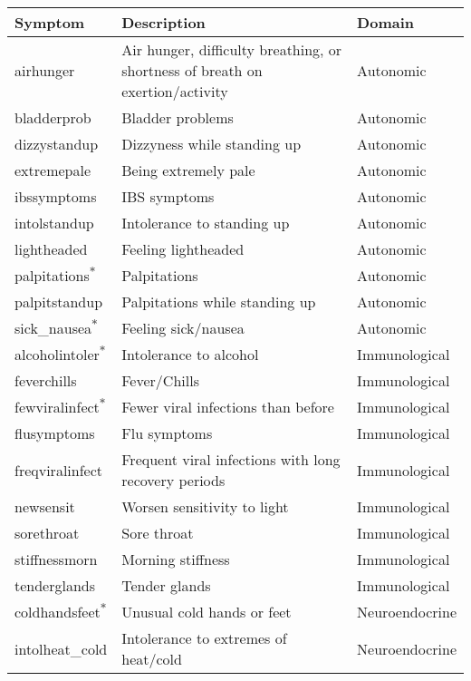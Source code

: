 \begin{tabular}{lll}
\toprule
Symptom & Description & Domain \\ 
\midrule
airhunger           & Air hunger, difficulty breathing, or shortness of breath on exertion/activity & Autonomic \\
bladderprob         & Bladder problems & Autonomic \\
dizzystandup        & Dizzyness while standing up & Autonomic \\
extremepale         & Being extremely pale & Autonomic \\
ibssymptoms         & IBS symptoms & Autonomic \\
intolstandup        & Intolerance to standing up & Autonomic \\
lightheaded         & Feeling lightheaded & Autonomic \\
palpitations\textsuperscript{${\ast}$}    & Palpitations & Autonomic \\
palpitstandup       & Palpitations while standing up & Autonomic \\
sick\_nausea\textsuperscript{${\ast}$}    & Feeling sick/nausea & Autonomic \\
alcoholintoler\textsuperscript{${\ast}$}  & Intolerance to alcohol & Immunological \\
feverchills         & Fever/Chills & Immunological \\
fewviralinfect\textsuperscript{${\ast}$}  & Fewer viral infections than before & Immunological \\
flusymptoms         & Flu symptoms & Immunological \\
freqviralinfect     & Frequent viral infections with long recovery periods & Immunological \\
newsensit           & Worsen sensitivity to light & Immunological \\
sorethroat          & Sore throat & Immunological \\
stiffnessmorn       & Morning stiffness & Immunological \\
tenderglands        & Tender glands & Immunological \\
coldhandsfeet\textsuperscript{${\ast}$} & Unusual cold hands or feet & Neuroendocrine \\
intolheat\_cold   & Intolerance to extremes of heat/cold & Neuroendocrine \\

\end{tabular}
